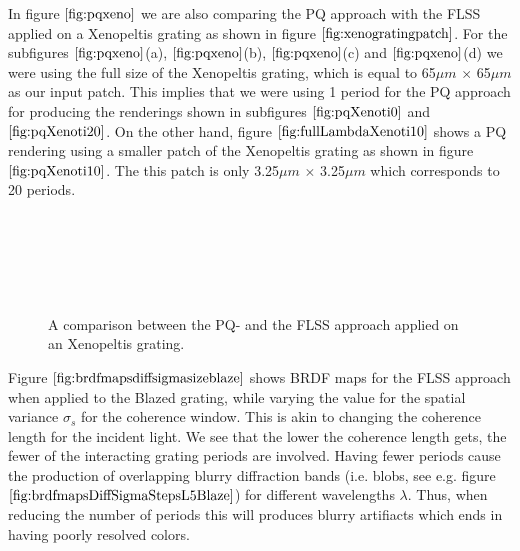 In figure $\ref{fig:pqxeno}$ we are also comparing the PQ approach with the FLSS applied on a Xenopeltis grating as shown in figure $\ref{fig:xenogratingpatch}$. For the subfigures $\ref{fig:pqxeno}$(a), $\ref{fig:pqxeno}$(b), $\ref{fig:pqxeno}$(c) and $\ref{fig:pqxeno}$(d) we were using the full size of the Xenopeltis grating, which is equal to 65$\mu m$ $\times$ 65$\mu m$ as our input patch. This implies that we were using 1 period for the PQ approach for producing the renderings shown in subfigures $\ref{fig:pqXenoti0}$ and $\ref{fig:pqXenoti20}$. On the other hand, figure $\ref{fig:fullLambdaXenoti10}$ shows a PQ rendering using a smaller patch of the Xenopeltis grating as shown in figure $\ref{fig:pqXenoti10}$. The this patch is only 3.25$\mu m$ $\times$ 3.25$\mu m$ which corresponds to 20 periods.

\begin{figure}[H]
  \centering
~
  
~
  
  ~
  
\caption[BRDF Map: PQ vs FLSS Approach on Xenopeltis Grating]{A comparison between the PQ- and the FLSS approach applied on an Xenopeltis grating.}
\label{fig:pqxeno}
\end{figure}

Figure $\ref{fig:brdfmapsdiffsigmasizeblaze}$ shows BRDF maps for the FLSS approach when applied to the Blazed grating, while varying the value for the spatial variance $\sigma_s$ for the coherence window. This is akin to changing the coherence length for the incident light. We see that the lower the coherence length gets, the fewer of the interacting grating periods are involved. Having fewer periods cause the production of overlapping blurry diffraction bands (i.e. blobs, see e.g. figure $\ref{fig:brdfmapsDiffSigmaStepsL5Blaze}$) for different wavelengths $\lambda$. Thus, when reducing the number of periods this will produces blurry artifiacts which ends in having poorly resolved colors.  

